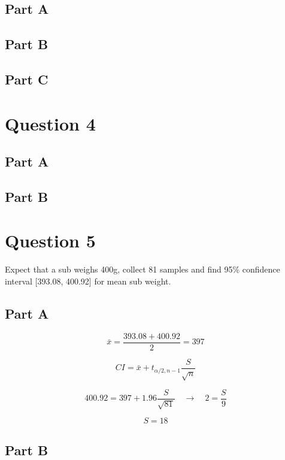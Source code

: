 \documentclass[letterpaper]{article}
\begin{document}
\subsection*{Part A}

\subsection*{Part B}

\subsection*{Part C}

\newpage

\section*{Question 4}

\subsection*{Part A}

\subsection*{Part B}

\newpage

\section*{Question 5}

Expect that a sub weighs 400g, collect 81 samples and find 95\% confidence interval [393.08, 400.92] for mean sub weight.

\subsection*{Part A}

$$\bar{x} = \frac{393.08 + 400.92}{2} = 397$$

$$CI = \bar{x} + t_{\alpha/2, n-1} \frac{S}{\sqrt{n}}$$

$$400.92 = 397 + 1.96 \frac{S}{\sqrt{81}} \quad \longrightarrow \quad 2 = \frac{S}{9}$$

$$S = 18$$

\subsection*{Part B}
\end{document}
